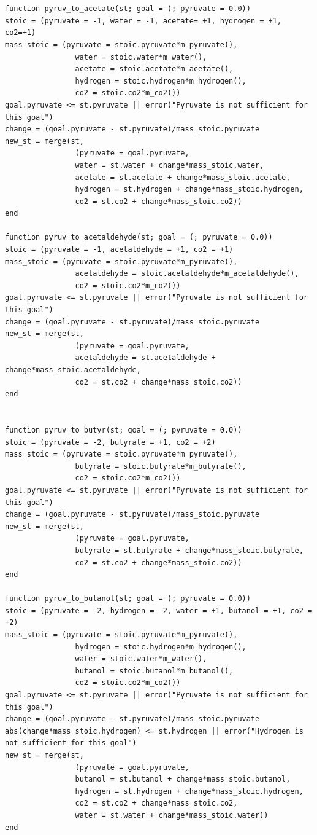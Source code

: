 \documentclass[11pt]{article}
\begin{document}
\begin{verbatim}


function pyruv_to_acetate(st; goal = (; pyruvate = 0.0))
stoic = (pyruvate = -1, water = -1, acetate= +1, hydrogen = +1, co2=+1)
mass_stoic = (pyruvate = stoic.pyruvate*m_pyruvate(),
                water = stoic.water*m_water(),
                acetate = stoic.acetate*m_acetate(),
                hydrogen = stoic.hydrogen*m_hydrogen(),
                co2 = stoic.co2*m_co2())
goal.pyruvate <= st.pyruvate || error("Pyruvate is not sufficient for this goal")
change = (goal.pyruvate - st.pyruvate)/mass_stoic.pyruvate
new_st = merge(st,
                (pyruvate = goal.pyruvate,
                water = st.water + change*mass_stoic.water,
                acetate = st.acetate + change*mass_stoic.acetate,
                hydrogen = st.hydrogen + change*mass_stoic.hydrogen,
                co2 = st.co2 + change*mass_stoic.co2))
end

function pyruv_to_acetaldehyde(st; goal = (; pyruvate = 0.0))
stoic = (pyruvate = -1, acetaldehyde = +1, co2 = +1)
mass_stoic = (pyruvate = stoic.pyruvate*m_pyruvate(),
                acetaldehyde = stoic.acetaldehyde*m_acetaldehyde(),
                co2 = stoic.co2*m_co2())
goal.pyruvate <= st.pyruvate || error("Pyruvate is not sufficient for this goal")
change = (goal.pyruvate - st.pyruvate)/mass_stoic.pyruvate
new_st = merge(st,
                (pyruvate = goal.pyruvate,
                acetaldehyde = st.acetaldehyde + change*mass_stoic.acetaldehyde,
                co2 = st.co2 + change*mass_stoic.co2))
end


function pyruv_to_butyr(st; goal = (; pyruvate = 0.0))
stoic = (pyruvate = -2, butyrate = +1, co2 = +2)
mass_stoic = (pyruvate = stoic.pyruvate*m_pyruvate(),
                butyrate = stoic.butyrate*m_butyrate(),
                co2 = stoic.co2*m_co2())
goal.pyruvate <= st.pyruvate || error("Pyruvate is not sufficient for this goal")
change = (goal.pyruvate - st.pyruvate)/mass_stoic.pyruvate
new_st = merge(st,
                (pyruvate = goal.pyruvate,
                butyrate = st.butyrate + change*mass_stoic.butyrate,
                co2 = st.co2 + change*mass_stoic.co2))
end

function pyruv_to_butanol(st; goal = (; pyruvate = 0.0))
stoic = (pyruvate = -2, hydrogen = -2, water = +1, butanol = +1, co2 = +2)
mass_stoic = (pyruvate = stoic.pyruvate*m_pyruvate(),
                hydrogen = stoic.hydrogen*m_hydrogen(),
                water = stoic.water*m_water(),
                butanol = stoic.butanol*m_butanol(),
                co2 = stoic.co2*m_co2())
goal.pyruvate <= st.pyruvate || error("Pyruvate is not sufficient for this goal")
change = (goal.pyruvate - st.pyruvate)/mass_stoic.pyruvate
abs(change*mass_stoic.hydrogen) <= st.hydrogen || error("Hydrogen is not sufficient for this goal")
new_st = merge(st,
                (pyruvate = goal.pyruvate,
                butanol = st.butanol + change*mass_stoic.butanol,
                hydrogen = st.hydrogen + change*mass_stoic.hydrogen,
                co2 = st.co2 + change*mass_stoic.co2,
                water = st.water + change*mass_stoic.water))
end


\end{verbatim}
\end{document}
